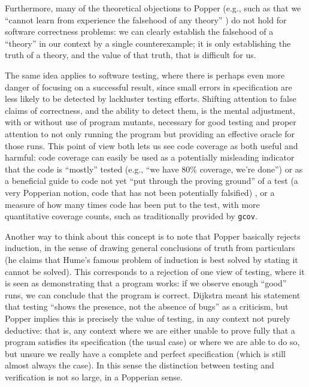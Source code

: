 \documentclass{svjour3}
\begin{document}
Furthermore, many of the theoretical objections to Popper (e.g., such
as that we ``cannot learn from experience the falsehood of any
theory'' \cite{lakatos}) do not hold for software correctness
problems:  we can clearly establish the falsehood of a ``theory'' in
our context by a single counterexample; it is only establishing the
truth of a theory, and the value of that truth, that is difficult for us.

The same idea applies to software testing, where there is perhaps even
more danger of focusing on a successful result, since small errors in
specification are less likely to be detected by lackluster testing
efforts.  Shifting attention to false claims of correctness, and the
ability to detect them, is the mental adjustment, with or without
use of program mutants, necessary for good testing and proper
attention to not only running the program but providing an effective
oracle \cite{oracleMcMinn} for those runs.  This point of view both
lets us see code coverage \cite{CovDisc} as both useful and harmful:
code coverage can easily be used as a potentially misleading indicator that the
code is ``mostly'' tested (e.g., ``we have 80\% coverage, we're
done'') or as a beneficial guide to code not yet ``put through the
proving ground'' of a test (a very Popperian notion, code that has not
been potentially falsified) \cite{ahmed_testedness}, or a measure of how many times code has
been put to the test, with more quantitative coverage counts, such as
traditionally provided by {\tt gcov}.

Another way to think about this concept is to note that Popper
basically rejects induction, in the sense of drawing general
conclusions of truth from particulars (he claims that Hume's famous
problem of induction \cite{Hume2} is best solved by stating it cannot
be solved).  This corresponds to a rejection of one view of testing,
where it is seen as demonstrating that a program works: if we observe
enough ``good'' runs, we can conclude that the program is correct.
Dijkstra meant his statement that testing ``shows the presence, not
the absence of bugs'' \cite{Dijkstra69} as
a criticism, but Popper implies this is precisely the value of
testing, in any context not purely deductive: that is, any context
where we are either unable to prove fully that a program satisfies its
specification (the usual case) or where we are able to do so, but
unsure we really have a complete and perfect specification (which is
still almost always the case).  In this sense the distinction between
testing and verification is not so large, in a Popperian sense.
\end{document}

